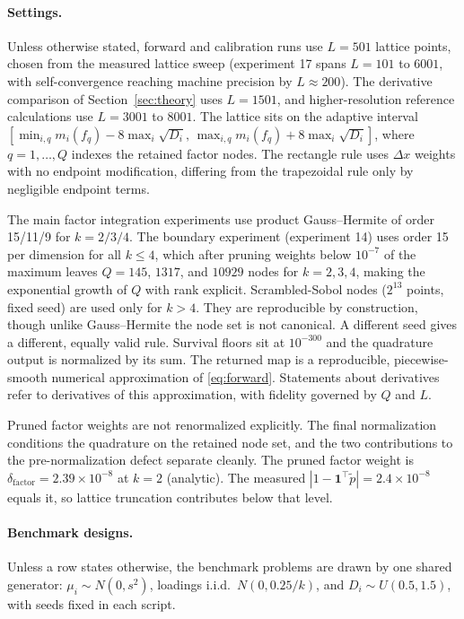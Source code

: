 \documentclass[12pt]{article}
\theoremstyle{remark}
\begin{document}
\paragraph{Settings.} Unless otherwise stated, forward and
calibration runs use $L = 501$ lattice points, chosen from the measured
lattice sweep (experiment 17 spans $L = 101$ to $6001$, with
self-convergence reaching machine precision by $L \approx 200$). The
derivative comparison of Section~\ref{sec:theory} uses $L = 1501$,
and higher-resolution reference calculations use $L = 3001$ to $8001$. The lattice sits on
the adaptive interval
$[\min_{i,q} m_i(f_q) - 8\max_i\sqrt{D_i},\,
\max_{i,q} m_i(f_q) + 8\max_i\sqrt{D_i}]$, where $q = 1, \dots, Q$ indexes
the retained factor nodes. The rectangle rule uses $\Delta x$ weights
with no endpoint modification, differing from the trapezoidal rule only
by negligible endpoint terms.

The main factor integration experiments use product
Gauss--Hermite of order 15/11/9 for $k = 2/3/4$. The boundary experiment
(experiment 14) uses order 15 per dimension for all $k \le 4$, which after
pruning weights below $10^{-7}$ of the maximum leaves $Q = 145$, $1317$, and
$10929$ nodes for $k = 2, 3, 4$, making the exponential growth of $Q$
with rank explicit. Scrambled-Sobol nodes ($2^{13}$ points, fixed seed)
are used only for $k > 4$. They are reproducible by construction, though
unlike Gauss--Hermite the node set is not canonical. A different seed
gives a different, equally valid rule. Survival floors sit at
$10^{-300}$ and the quadrature output is normalized by its sum. The
returned map is a reproducible, piecewise-smooth numerical approximation
of \eqref{eq:forward}. Statements about derivatives refer to
derivatives of this approximation, with fidelity governed by $Q$ and
$L$.

Pruned factor weights are not renormalized explicitly. The final
normalization conditions the quadrature on the retained node set, and the
two contributions to the pre-normalization defect separate cleanly. The
pruned factor weight is $\delta_{\mathrm{factor}} = 2.39\times10^{-8}$
at $k=2$ (analytic). The measured $|1 - \mathbf{1}^\top \tilde p| =
2.4\times10^{-8}$ equals it, so lattice truncation contributes below that
level.

\paragraph{Benchmark designs.} Unless a row states otherwise, the
benchmark problems are drawn by one shared generator: $\mu_i \sim
N(0, s^2)$, loadings i.i.d.\ $N(0, 0.25/k)$, and $D_i \sim
U(0.5, 1.5)$, with seeds fixed in each script.
\end{document}
